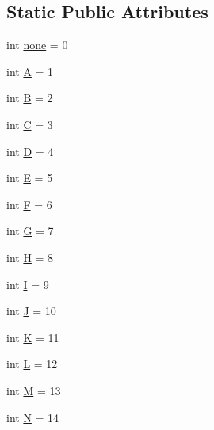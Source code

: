 \subsection*{Static Public Attributes}
\begin{DoxyCompactItemize}
\item 
int \mbox{\hyperlink{classbridges_1_1named__symbol_1_1_named_symbol_a0d22eb05a76128d7a8848b263f32b851}{none}} = 0
\item 
int \mbox{\hyperlink{classbridges_1_1named__symbol_1_1_named_symbol_ad5f315e2dbd3b3c40e9ce00947bda2ca}{A}} = 1
\item 
int \mbox{\hyperlink{classbridges_1_1named__symbol_1_1_named_symbol_a496be7c4df83f50aa28ee6aaf63e92cf}{B}} = 2
\item 
int \mbox{\hyperlink{classbridges_1_1named__symbol_1_1_named_symbol_a0bc5f082b9a08bbfe8e30e8fc55434ba}{C}} = 3
\item 
int \mbox{\hyperlink{classbridges_1_1named__symbol_1_1_named_symbol_a24df9655aee332398622d1675355f6e4}{D}} = 4
\item 
int \mbox{\hyperlink{classbridges_1_1named__symbol_1_1_named_symbol_a77a54e04406ed9d84fd0f9835e433aa4}{E}} = 5
\item 
int \mbox{\hyperlink{classbridges_1_1named__symbol_1_1_named_symbol_a825003973fd3592c2564da32df47b7e1}{F}} = 6
\item 
int \mbox{\hyperlink{classbridges_1_1named__symbol_1_1_named_symbol_a3c14915c740b796131858662b6fb4cbb}{G}} = 7
\item 
int \mbox{\hyperlink{classbridges_1_1named__symbol_1_1_named_symbol_afb905428e457a17e3a26f42b7a275602}{H}} = 8
\item 
int \mbox{\hyperlink{classbridges_1_1named__symbol_1_1_named_symbol_a38cd2af55f5e54a95ffeb6646726f1e1}{I}} = 9
\item 
int \mbox{\hyperlink{classbridges_1_1named__symbol_1_1_named_symbol_ab202355c03209937ec4c11a64bc60baa}{J}} = 10
\item 
int \mbox{\hyperlink{classbridges_1_1named__symbol_1_1_named_symbol_ab14293a887b595c459f1b194d50dc9ae}{K}} = 11
\item 
int \mbox{\hyperlink{classbridges_1_1named__symbol_1_1_named_symbol_a0f5d08603fc2dde1d2f353ed78f4f41c}{L}} = 12
\item 
int \mbox{\hyperlink{classbridges_1_1named__symbol_1_1_named_symbol_a650c8c76ee91b4ba996985e4f75028f0}{M}} = 13
\item 
int \mbox{\hyperlink{classbridges_1_1named__symbol_1_1_named_symbol_a0d08f0a019f5d3e38aa0124c3a1aba3a}{N}} = 14

\end{DoxyCompactItemize}
